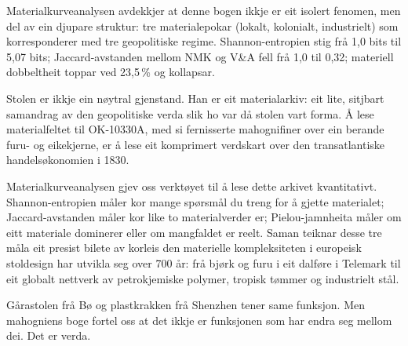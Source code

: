 \documentclass[10pt, a4paper, twocolumn]{article}
\begin{document}
Materialkurveanalysen avdekkjer at denne bogen ikkje er eit isolert fenomen, men del av ein djupare struktur: tre materialepokar (lokalt, kolonialt, industrielt) som korresponderer med tre geopolitiske regime. Shannon-entropien stig frå 1,0 bits til 5,07 bits; Jaccard-avstanden mellom NMK og V\&A fell frå 1,0 til 0,32; materiell dobbeltheit toppar ved 23,5\,\% og kollapsar.

Stolen er ikkje ein nøytral gjenstand. Han er eit materialarkiv: eit lite, sitjbart samandrag av den geopolitiske verda slik ho var då stolen vart forma. Å lese materialfeltet til OK-10330A, med si fernisserte mahognifiner over ein berande furu- og eikekjerne, er å lese eit komprimert verdskart over den transatlantiske handelsøkonomien i 1830.

Materialkurveanalysen gjev oss verktøyet til å lese dette arkivet kvantitativt. Shannon-entropien måler kor mange spørsmål du treng for å gjette materialet; Jaccard-avstanden måler kor like to materialverder er; Pielou-jamnheita måler om eitt materiale dominerer eller om mangfaldet er reelt. Saman teiknar desse tre måla eit presist bilete av korleis den materielle kompleksiteten i europeisk stoldesign har utvikla seg over 700 år: frå bjørk og furu i eit dalføre i Telemark til eit globalt nettverk av petrokjemiske polymer, tropisk tømmer og industrielt stål.

Gårastolen frå Bø og plastkrakken frå Shenzhen tener same funksjon. Men mahogniens boge fortel oss at det ikkje er funksjonen som har endra seg mellom dei. Det er verda.




\end{document}
